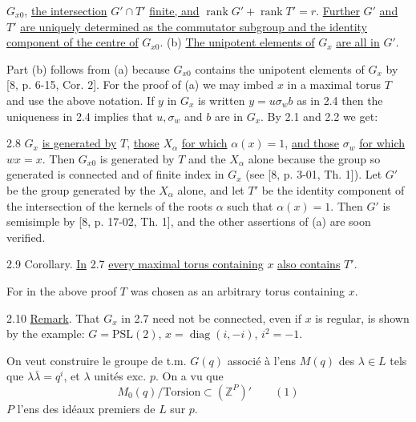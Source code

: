 

$G_{x0}$, \uline{the intersection} $G'\cap T'$ \uline{finite, and} $\operatorname{rank}G'+\operatorname{rank}T'=r$. \uline{Further} $G'$ \uline{and} $T'$ \uline{are uniquely determined as the commutator subgroup and the identity component of the centre of} $G_{x0}$. (b) \uline{The unipotent elements of} $G_x$ \uline{are all in} $G'$.

Part (b) follows from (a) because $G_{x0}$ contains the unipotent elements of $G_x$ by [8, p. 6-15, Cor. 2]. For the proof of (a) we may imbed $x$ in a maximal torus $T$ and use the above notation. If $y$ in $G_x$ is written $y=u\sigma_wb$ as in 2.4 then the uniqueness in 2.4 implies that $u,\sigma_w$ and $b$ are in $G_x$. By 2.1 and 2.2 we get:

2.8 $G_x$ \uline{is generated by} $T$, \uline{those} $X_\alpha$ \uline{for which} $\alpha(x)=1$, \uline{and those} $\sigma_w$ \uline{for which} $wx=x$. Then $G_{x0}$ is generated by $T$ and the $X_\alpha$ alone because the group so generated is connected and of finite index in $G_x$ (see [8, p. 3-01, Th. 1]). Let $G'$ be the group generated by the $X_\alpha$ alone, and let $T'$ be the identity component of the intersection of the kernels of the roots $\alpha$ such that $\alpha(x)=1$. Then $G'$ is semisimple by [8, p. 17-02, Th. 1], and the other assertions of (a) are soon verified.

2.9 Corollary. \uline{In} 2.7 \uline{every maximal torus containing} $x$ \uline{also contains} $T'$.

For in the above proof $T$ was chosen as an arbitrary torus containing $x$.

2.10 \uline{Remark}. That $G_x$ in 2.7 need not be connected, even if $x$ is regular, is shown by the example: $G=\mathrm{PSL}(2)$, $x=\operatorname{diag}(i,-i)$, $i^2=-1$.



On veut construire le groupe de t.m. $G(q)$ associé à l'ens $M(q)$ des $\lambda\in L$ tels que $\lambda\bar\lambda=q^i$, et $\lambda$ unités exc. $p$. On a vu que
\[
M_0(q)/\text{Torsion}\subset (\mathbb Z^P)' \qquad (1)
\]
$P$ l'ens des idéaux premiers de $L$ sur $p$.

